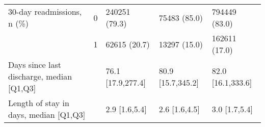 \begin{tabular}{lllll}
30-day readmissions, n (\%) & 0 &             240251 (79.3) &       75483 (85.0) &      794449 (83.0) \\
                                       & 1 &              62615 (20.7) &       13297 (15.0) &      162611 (17.0) \\
Days since last discharge, median [Q1,Q3] &   &         76.1 [17.9,277.4] &  80.9 [15.7,345.2] &  82.0 [16.1,333.6] \\
Length of stay in days, median [Q1,Q3] &   &             2.9 [1.6,5.4] &      2.6 [1.6,4.5] &      3.0 [1.7,5.4] \\
\bottomrule
\end{tabular}
